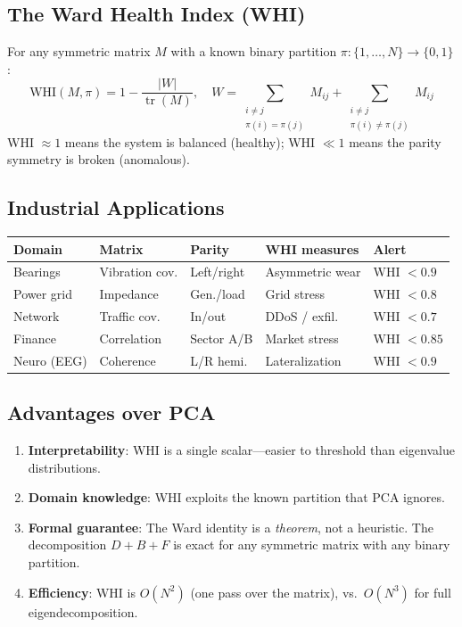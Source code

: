 \documentclass[11pt,a4paper]{article}
\begin{document}
\subsection{The Ward Health Index (WHI)}

For any symmetric matrix $M$ with a known binary partition
$\pi: \{1,\ldots,N\} \to \{0,1\}$:
\begin{equation}
  \text{WHI}(M, \pi) = 1 - \frac{|W|}{\operatorname{tr}(M)},
  \quad W = \sum_{\substack{i \neq j \\ \pi(i) = \pi(j)}} M_{ij}
  + \sum_{\substack{i \neq j \\ \pi(i) \neq \pi(j)}} M_{ij}
\end{equation}
WHI $\approx 1$ means the system is balanced (healthy);
WHI $\ll 1$ means the parity symmetry is broken (anomalous).

\subsection{Industrial Applications}

\begin{center}
\small
\begin{tabular}{@{}lllll@{}}
\toprule
\textbf{Domain} & \textbf{Matrix} & \textbf{Parity} & \textbf{WHI measures} & \textbf{Alert} \\
\midrule
Bearings & Vibration cov. & Left/right & Asymmetric wear & WHI $< 0.9$ \\
Power grid & Impedance & Gen./load & Grid stress & WHI $< 0.8$ \\
Network & Traffic cov. & In/out & DDoS / exfil. & WHI $< 0.7$ \\
Finance & Correlation & Sector A/B & Market stress & WHI $< 0.85$ \\
Neuro (EEG) & Coherence & L/R hemi. & Lateralization & WHI $< 0.9$ \\
\bottomrule
\end{tabular}
\end{center}

\subsection{Advantages over PCA}

\begin{enumerate}
  \item \textbf{Interpretability}: WHI is a single scalar---easier
    to threshold than eigenvalue distributions.
  \item \textbf{Domain knowledge}: WHI exploits the known partition
    that PCA ignores.
  \item \textbf{Formal guarantee}: The Ward identity is a
    \emph{theorem}, not a heuristic. The decomposition $D + B + F$
    is exact for any symmetric matrix with any binary partition.
  \item \textbf{Efficiency}: WHI is $O(N^2)$ (one pass over the
    matrix), vs.\ $O(N^3)$ for full eigendecomposition.
\end{enumerate}
\end{document}
